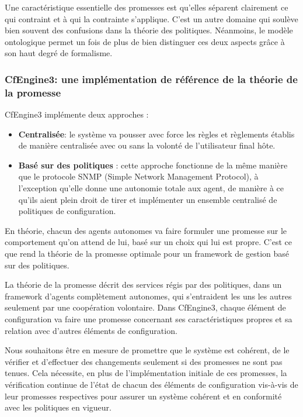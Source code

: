 Une caractéristique essentielle des promesses est qu'elles séparent clairement
ce qui contraint et à qui la contrainte s'applique. C'est un autre domaine qui
soulève bien souvent des confusions dans la théorie des politiques. Néanmoins,
le modèle ontologique permet un fois de plus de bien distinguer ces deux
aspects grâce à son haut degré de formalisme.

\subsubsection{CfEngine3: une implémentation de référence de la théorie de la
promesse}

CfEngine3 implémente deux approches :

\begin{itemize}
    \item \textbf{Centralisée}: 
        le système va pousser avec force les règles et règlements établis de
        manière centralisée avec ou sans la volonté de l'utilisateur final hôte.
    \item \textbf{Basé sur des politiques} :
        cette approche fonctionne de la même manière que le protocole SNMP
        (Simple Network Management Protocol), à l'exception qu'elle donne une
        autonomie totale aux agent, de manière à ce qu'ils aient plein droit de
        tirer et implémenter un ensemble centralisé de politiques de
        configuration.
\end{itemize}

En théorie, chacun des agents autonomes va faire formuler une promesse sur le
comportement qu'on attend de lui, basé sur un choix qui lui est propre. C'est ce
que rend la théorie de la promesse optimale pour un framework de gestion basé
sur des politiques.

La théorie de la promesse décrit des services régis par des politiques, dans un
framework d'agents complètement autonomes, qui s'entraident les uns les autres
seulement par une coopération volontaire. Dans CfEngine3, chaque élément de
configuration va faire une promesse concernant ses caractéristiques propres et
sa relation avec d'autres éléments de configuration.

Nous souhaitons être en mesure de promettre que le système est cohérent, de le
vérifier et d'effectuer des changements seulement si des promesses ne sont pas
tenues. Cela nécessite, en plus de l'implémentation initiale de ces promesses,
la vérification continue de l'état de chacun des éléments de configuration
vis-à-vis de leur promesses respectives pour assurer un système cohérent et en
conformité avec les politiques en vigueur.

